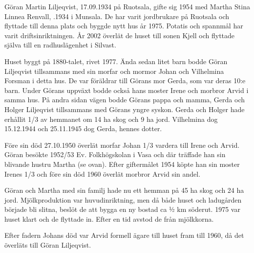 Göran Martin Liljeqvist, 17.09.1934 på Ruotsala, gifte sig 1954 med Martha Stina Linnea Renvall, .1934 i Munsala. De har varit jordbrukare på Ruotsala och flyttade till denna plats och byggde nytt hus år 1975. Potatis och spannmål har varit driftsinriktningen. År 2002 överlät de huset till sonen Kjell och flyttade själva till en radhuslägenhet i Silvast.
\begin{jhchildren}
  \item {}
  \item {}
  \item {}
  \item {}
\end{jhchildren}





Huset byggt på 1880-talet, rivet 1977. Ända sedan litet barn bodde Göran Liljeqvist tillsammans med sin morfar och mormor Johan och Vilhelmina Forsman i detta hus. De var föräldrar till Görans mor Gerda, som var deras 10:e barn. Under Görans uppväxt bodde också hans moster Irene och morbror Arvid i samma hus. På andra sidan vägen bodde Görans pappa och mamma, Gerda och Holger Liljeqvist tillsammans med Görans yngre syskon. Gerda och Holger hade erhållit 1/3 av hemmanet om 14 ha skog och 9 ha jord. Vilhelmina dog 15.12.1944 och 25.11.1945 dog Gerda, hennes dotter.

Före sin död 27.10.1950 överlät morfar Johan 1/3 vardera till Irene och Arvid. Göran besökte 1952/53 Ev. Folkhögskolan i Vasa och där träffade han sin blivande hustru Martha (se ovan). Efter giftermålet 1954 köpte han sin moster Irenes 1/3 och före sin död 1960 överlät morbror Arvid sin andel.

Göran och Martha med sin familj hade nu ett hemman på 45 ha skog och 24 ha jord. Mjölkproduktion var huvudinriktning, men då både huset och ladugården började bli slitna, beslöt de att bygga en ny bostad ca ½ km söderut. 1975 var huset klart och de flyttade in. Efter en tid avstod de från mjölkkorna.


Efter fadern Johans död var Arvid formell ägare till huset fram till 1960, då det överläts till Göran Liljeqvist.\jhvspace{}


